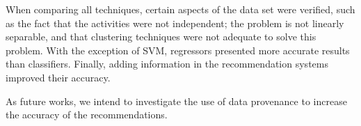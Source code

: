 \documentclass{doublecol-new}
\theoremstyle{TH}{
\newtheorem{lemma}{Lemma}
\newtheorem{theorem}[lemma]{Theorem}
\newtheorem{corrolary}[lemma]{Corrolary}
\newtheorem{conjecture}[lemma]{Conjecture}
\newtheorem{proposition}[lemma]{Proposition}
\newtheorem{claim}[lemma]{Claim}
\newtheorem{stheorem}[lemma]{Wrong Theorem}
\newtheorem{algorithm}{Algorithm}
}
\theoremstyle{THrm}{
\newtheorem{definition}{Definition}[section]
\newtheorem{question}{Question}[section]
\newtheorem{remark}{Remark}
\newtheorem{scheme}{Scheme}
}
\theoremstyle{THhit}{
\newtheorem{case}{Case}[section]
}
\begin{document}
When comparing all techniques, certain aspects of the data set were verified, such as the fact that the activities were not independent; the problem is not linearly separable, and that clustering techniques were not adequate to solve this problem. With the exception of SVM, regressors presented more accurate results than classifiers. Finally, adding information in the recommendation systems improved their accuracy.

As future works, we intend to investigate the use of data provenance to increase the accuracy of the recommendations.





%
%
%
\end{document}
